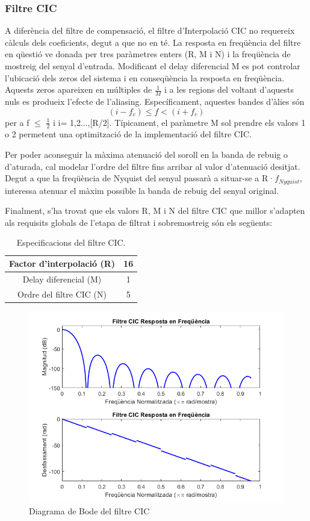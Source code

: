 \subsubsection{Filtre CIC}
A diferència del filtre de compensació, el filtre d'Interpolació CIC no requereix càlculs dels coeficients, degut a que no en té. La resposta en freqüència del filtre en qüestió ve donada per tres paràmetres enters (R, M i N) i la freqüència de mostreig del senyal d'entrada. Modificant el delay diferencial M es pot controlar l'ubicació dels zeros del sistema i en conseqüència la resposta en freqüència. Aquests zeros apareixen en múltiples de $\frac{1}{M}$ i a les regions del voltant d'aquests nuls es produeix l'efecte de l'aliasing. Específicament, aquestes bandes d'àlies són \[(i-f_c) \leq f < (i + f_c)\] per a f $\leq$ $\frac{1}{2}$ i i= 1,2...,[R/2]. Típicament, el paràmetre M sol prendre els valors 1 o 2 permetent una optimització de la implementació del filtre CIC. 
\par Per poder aconseguir la màxima atenuació del soroll en la banda de rebuig o d'aturada, cal modelar l'ordre del filtre fins arribar al valor d'atenuació desitjat. Degut a que la freqüència de Nyquist del senyal passarà a situar-se a R·$f_{Nyquist}$, interessa atenuar el màxim possible la banda de rebuig del senyal original. 
\par Finalment, s'ha trovat que els valors R, M i N del filtre CIC que millor s'adapten als requisits globals de l'etapa de filtrat i sobremostreig són els següents:
\begin{table}[H]
    \centering
    \begin{tabular}{ | c | c | }
    \hline
    \centering
     Factor d'interpolació (R)       &  16\\ \hline
     \centering
     Delay diferencial (M)       &  1\\ \hline
     \centering
     Ordre del filtre CIC (N)        &  5 \\ \hline
    \end{tabular}
    \caption{Especificacions del filtre CIC.}
    \label{taula_filtre_CIC}
\end{table}
\begin{figure}[H]
    \centering
    \includegraphics[width=0.5\linewidth]{Images/CIC_Filter.png}
    \caption{Diagrama de Bode del filtre CIC}
    \label{CIC_Bode_fig}
\end{figure}

